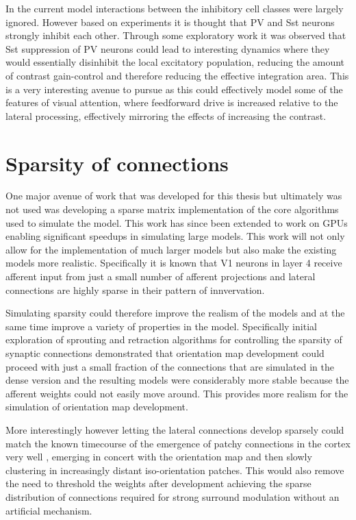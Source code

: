 In the current model interactions between the inhibitory cell classes
were largely ignored. However based on experiments it is thought that
PV and Sst neurons strongly inhibit each other. Through some
exploratory work it was observed that Sst suppression of PV neurons
could lead to interesting dynamics where they would essentially
disinhibit the local excitatory population, reducing the amount of
contrast gain-control and therefore reducing the effective integration
area. This is a very interesting avenue to pursue as this could
effectively model some of the features of visual attention, where
feedforward drive is increased relative to the lateral processing,
effectively mirroring the effects of increasing the contrast.

\section{Sparsity of connections}

One major avenue of work that was developed for this thesis but
ultimately was not used was developing a sparse matrix implementation
of the core algorithms used to simulate the model. This work has since
been extended to work on GPUs enabling significant speedups in
simulating large models. This work will not only allow for the
implementation of much larger models but also make the existing models
more realistic. Specifically it is known that V1 neurons in layer 4
receive afferent input from just a small number of afferent
projections and lateral connections are highly sparse in their pattern
of innvervation.

Simulating sparsity could therefore improve the realism of the models
and at the same time improve a variety of properties in the
model. Specifically initial exploration of sprouting and retraction
algorithms for controlling the sparsity of synaptic connections
demonstrated that orientation map development could proceed with just
a small fraction of the connections that are simulated in the dense
version and the resulting models were considerably more stable because
the afferent weights could not easily move around. This provides more
realism for the simulation of orientation map development.

More interestingly however letting the lateral connections develop
sparsely could match the known timecourse of the emergence of patchy
connections in the cortex very well \citep{Ruthazer1996}, emerging in
concert with the orientation map and then slowly clustering in
increasingly distant iso-orientation patches. This would also remove
the need to threshold the weights after development achieving the
sparse distribution of connections required for strong surround
modulation without an artificial mechanism.

